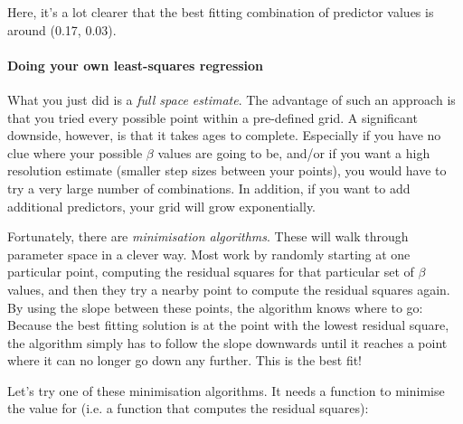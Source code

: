 \documentclass[11pt]{article}
\begin{document}
    Here, it's a lot clearer that the best fitting combination of predictor
values is around (0.17, 0.03).

    \paragraph{Doing your own least-squares
regression}\label{doing-your-own-least-squares-regression}

What you just did is a \emph{full space estimate}. The advantage of such
an approach is that you tried every possible point within a pre-defined
grid. A significant downside, however, is that it takes ages to
complete. Especially if you have no clue where your possible \(\beta\)
values are going to be, and/or if you want a high resolution estimate
(smaller step sizes between your points), you would have to try a very
large number of combinations. In addition, if you want to add additional
predictors, your grid will grow exponentially.

Fortunately, there are \emph{minimisation algorithms}. These will walk
through parameter space in a clever way. Most work by randomly starting
at one particular point, computing the residual squares for that
particular set of \(\beta\) values, and then they try a nearby point to
compute the residual squares again. By using the slope between these
points, the algorithm knows where to go: Because the best fitting
solution is at the point with the lowest residual square, the algorithm
simply has to follow the slope downwards until it reaches a point where
it can no longer go down any further. This is the best fit!

Let's try one of these minimisation algorithms. It needs a function to
minimise the value for (i.e. a function that computes the residual
squares):
\end{document}
